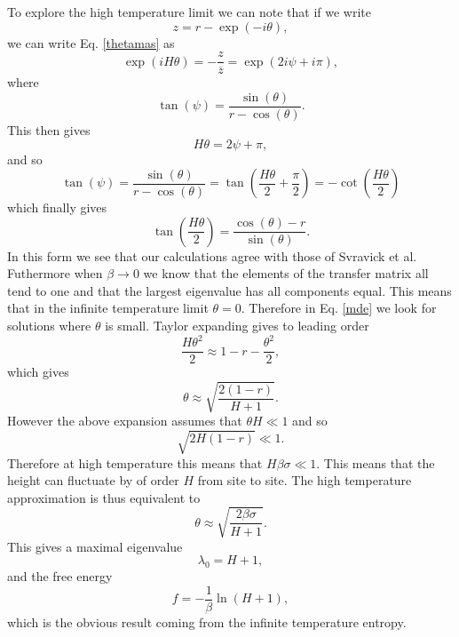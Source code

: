 To explore the high temperature limit we can note that if we write
\begin{equation}
z= r-\exp(-i\theta),
\end{equation}
we can write Eq. \eqref{thetamas} as
\begin{equation}
\exp(iH\theta)  = -\frac{z}{\overline z} = \exp(2i\psi + i\pi),
\end{equation}
where
\begin{equation}
\tan(\psi) = \frac{\sin(\theta)}{r-\cos(\theta)}.
\end{equation}
This then gives 
\begin{equation}
H\theta = 2\psi + \pi,
\end{equation}
and so
\begin{equation}
\tan(\psi) = \frac{\sin(\theta)}{r-\cos(\theta)}= \tan(\frac{H\theta}{2} +\frac{\pi}{2})= -\cot(\frac{H\theta}{2})
\end{equation}
which finally gives
\begin{equation}
\tan(\frac{H\theta}{2}) = \frac{\cos(\theta)-r}{\sin(\theta)}.\label{mde}
\end{equation}
In this form we see that our calculations agree with those of Svravick et al. Futhermore when $\beta\to 0$ we know that the elements of the transfer matrix all tend to one and that the largest eigenvalue has all components equal. This means that in the  infinite temperature limit $\theta=0$. Therefore in Eq. \eqref{mde} we look for solutions where $\theta$ is small. Taylor expanding gives to leading order
\begin{equation}
\frac{H\theta^2}{2} \approx1-r-\frac{\theta^2}{2},
\end{equation}
which gives
\begin{equation}
\theta \approx \sqrt{\frac{2(1-r)}{H+1}}.
\end{equation}
However the above expansion assumes that $\theta H\ll1$ and so
\begin{equation}
\sqrt{2H(1-r)} \ll 1.
\end{equation}
Therefore at high temperature this means that $H\beta\sigma\ll1$. This means that the height can fluctuate by of order $H$ from site to site. The high temperature approximation is thus equivalent to
 \begin{equation}
\theta \approx \sqrt{\frac{2\beta\sigma}{H+1}}.
\end{equation}
This gives a maximal eigenvalue
\begin{equation}
\lambda_0 = H+1,
\end{equation}
and the free energy
\begin{equation}
f=-\frac{1}{\beta}\ln(H+1),
\end{equation}
which is the obvious result coming from the infinite temperature entropy. 

